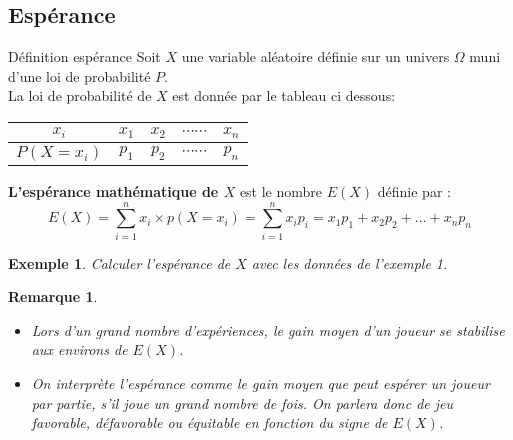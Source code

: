 \documentclass[10pt,a4paper]{article}
\renewcommand{\arraystretch}{}
\theoremstyle{break}
\newtheorem{Rem}{Remarque}
\newtheorem{Ex}{Exemple}
\begin{document}
	
\subsection{Espérance}
		\begin{bclogo}[couleur = yellow!30,arrondi =0.1,logo =\bcbook]{Définition espérance} 
		Soit $X$ une variable aléatoire définie sur un univers $\Omega$ muni d'une loi de probabilité $P$.\\
		La loi de probabilité de $X$ est donnée par le tableau ci dessous:
		\begin{center}
			\renewcommand{\arraystretch}{1.5}
			\begin{tabular}{|c|c|c|c|c|}
				\hline
				$x_i$&$x_1$&$x_2$&$\cdots\cdots$&$x_n$\\
				\hline
				$P(X=x_i)$&	$p_1$&	$p_2$&	$\cdots\cdots$&$p_n$\\
				\hline
			\end{tabular}
		\end{center}
		
		\textbf{	L'espérance mathématique de $X$} est le nombre $E(X)$ définie par : 
		$$ E(X)=\sum_{i=1}^nx_i\times p(X=x_i)= \sum_{i=1}^nx_ip_i= x_1p_1+x_2p_2+\dots +x_np_n $$
		
	\end{bclogo}
	\begin{Ex}
		Calculer l'espérance de $X$ avec les données de l'exemple 1.
	\end{Ex}
	\begin{Rem}
		\begin{itemize}
			
			\item Lors d'un grand nombre d'expériences, le gain moyen d'un joueur se stabilise aux environs de $E(X)$.
			\item On interprète l'espérance comme le gain moyen que peut espérer un joueur par partie, 
			s'il joue un grand nombre de fois. On parlera donc de jeu favorable, défavorable ou équitable en 
			fonction du signe de $E(X)$.
		\end{itemize}
	\end{Rem}
\end{document}
